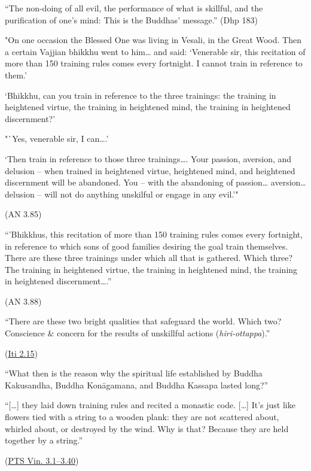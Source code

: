 ``The non-doing of all evil, the performance of what is skillful, and
the purification of one's mind: This is the Buddhas' message.'' (Dhp
183)

"On one occasion the Blessed One was living in Vesali, in the Great
Wood. Then a certain Vajjian bhikkhu went to him\ldots{} and said:
`Venerable sir, this recitation of more than 150 training rules comes
every fortnight. I cannot train in reference to them.'

`Bhikkhu, can you train in reference to the three trainings: the
training in heightened virtue, the training in heightened mind, the
training in heightened discernment?'

"`Yes, venerable sir, I can\ldots.'

`Then train in reference to those three trainings\ldots. Your passion,
aversion, and delusion -- when trained in heightened virtue, heightened
mind, and heightened discernment will be abandoned. You -- with the
abandoning of passion\ldots{} aversion\ldots{} delusion -- will not do
anything unskilful or engage in any evil.'"

(AN 3.85)

``'Bhikkhus, this recitation of more than 150 training rules comes every
fortnight, in reference to which sons of good families desiring the goal
train themselves. There are these three trainings under which all that
is gathered. Which three? The training in heightened virtue, the
training in heightened mind, the training in heightened
discernment\ldots.''

(AN 3.88)

``There are these two bright qualities that safeguard the world. Which
two? Conscience \& concern for the results of unskillful actions
(\emph{hiri-ottappa}).''

(\href{https://www.accesstoinsight.org/tipitaka/kn/iti/iti.2.028-049.than.html\#iti-042}{Iti
2.15})

``What then is the reason why the spiritual life established by Buddha
Kakusandha, Buddha Konāgamana, and Buddha Kassapa lasted long?''

``{[}\ldots{]} they laid down training rules and recited a monastic
code. {[}\ldots{]} It's just like flowers tied with a string to a wooden
plank: they are not scattered about, whirled about, or destroyed by the
wind. Why is that? Because they are held together by a string.''

(\href{https://suttacentral.net/pli-tv-bu-vb-pj1/en/brahmali}{PTS Vin.
3.1--3.40})

